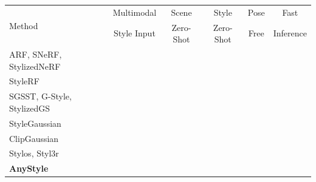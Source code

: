 \documentclass{standalone}
\newcommand{\cmark}{\textcolor{green!70!black}{\ding{51}}} %
\newcommand{\xmark}{\textcolor{red!70!black}{\ding{55}}}   %
\def\our{AnyStyle}
\begin{document}
\centering
\begin{tabular}{@{}l@{\;}ccccc@{}}
\toprule
\multirow{2}{*}{Method} &
Multimodal &
Scene &
Style &
Pose &
Fast \\
& Style Input
& Zero-Shot
& Zero-Shot
& Free
& Inference \\
\midrule
ARF, SNeRF, StylizedNeRF %
& \xmark & \xmark & \xmark & \xmark & \xmark \\
StyleRF
& \xmark & \xmark & \cmark & \xmark & \xmark \\
SGSST, G-Style, StylizedGS
& \xmark & \xmark & \xmark & \xmark & \cmark \\
StyleGaussian
& \xmark & \xmark & \cmark & \xmark & \cmark \\
ClipGaussian
& \cmark & \xmark & \xmark & \xmark & \cmark \\
Stylos, Styl3r
& \xmark & \cmark & \cmark & \cmark & \cmark \\
\midrule
\textbf{\our{}}
& \cmark & \cmark & \cmark & \cmark & \cmark \\
\bottomrule
\end{tabular}
\end{document}
